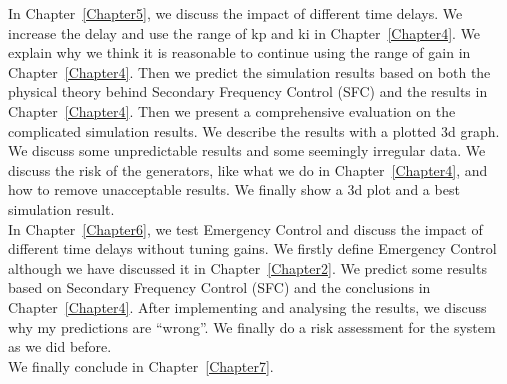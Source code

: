 In Chapter~\ref{Chapter5}, we discuss the impact of different time delays. We increase the delay and use the range of kp and ki in Chapter~\ref{Chapter4}. We explain why we think it is reasonable to continue using the range of gain in Chapter~\ref{Chapter4}. Then we predict the simulation results based on both the physical theory behind Secondary Frequency Control (SFC) and the results in Chapter~\ref{Chapter4}. Then we present a comprehensive evaluation on the complicated simulation results. We describe the results with a plotted 3d graph. We discuss some unpredictable results and some seemingly irregular data. We discuss the risk of the generators, like what we do in Chapter~\ref{Chapter4}, and how to remove unacceptable results. We  finally show a 3d plot and a best simulation result.\\

In Chapter~\ref{Chapter6}, we test Emergency Control and discuss the impact of different time delays without tuning gains. We firstly define Emergency Control although we have discussed it in Chapter~\ref{Chapter2}. We predict some results based on Secondary Frequency Control (SFC) and the conclusions in Chapter~\ref{Chapter4}. After implementing and analysing the results, we discuss why my predictions are “wrong”. We finally do a risk assessment for the system as we did before.\\


We finally conclude in Chapter~\ref{Chapter7}.\\